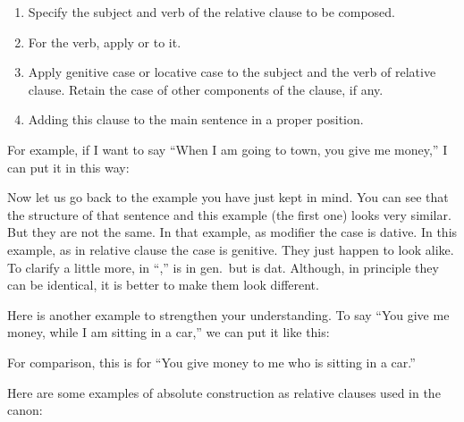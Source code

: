 \begin{enumerate}
\item Specify the subject and verb of the relative clause to be composed.
\item For the verb, apply  or  to it.
\item Apply genitive case or locative case to the subject and the verb of relative clause. Retain the case of other components of the clause, if any.
\item Adding this clause to the main sentence in a proper position.
\end{enumerate}

For example, if I want to say ``When I am going to town, you give me money,'' I can put it in this way:


Now let us go back to the example you have just kept in mind. You can see that the structure of that sentence and this example (the first one) looks very similar. But they are not the same. In that example, as modifier the case is dative. In this example, as in relative clause the case is genitive. They just happen to look alike. To clarify a little more, in ``,''  is in gen.\ but  is dat. Although, in principle they can be identical, it is better to make them look different.

Here is another example to strengthen your understanding. To say ``You give me money, while I am sitting in a car,'' we can put it like this:


For comparison, this is for ``You give money to me who is sitting in a car.''


Here are some examples of absolute construction as relative clauses used in the canon:

